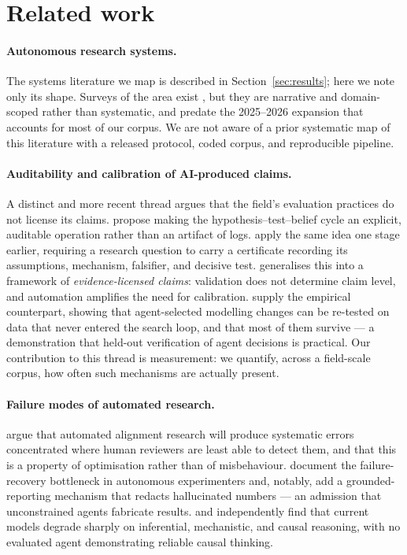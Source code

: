 \section{Related work}
\label{sec:related}

\paragraph{Autonomous research systems.} The systems literature we map is described in
Section~\ref{sec:results}; here we note only its shape. Surveys of the area exist
\citep{ramos2024llmchem}, but they are narrative and domain-scoped rather than systematic,
and predate the 2025--2026 expansion that accounts for most of our corpus. We are not aware
of a prior systematic map of this literature with a released protocol, coded corpus, and
reproducible pipeline.

\paragraph{Auditability and calibration of AI-produced claims.} A distinct and more recent
thread argues that the field's evaluation practices do not license its claims.
\citet{takahara2026hep} propose making the hypothesis--test--belief cycle an explicit,
auditable operation rather than an artifact of logs. \citet{wang2026firstresearch} apply the
same idea one stage earlier, requiring a research question to carry a certificate recording
its assumptions, mechanism, falsifier, and decisive test. \citet{li2026calibration} generalises
this into a framework of \emph{evidence-licensed claims}: validation does not determine claim
level, and automation amplifies the need for calibration. \citet{ning2026autoresearch}
supply the empirical counterpart, showing that agent-selected modelling changes can be
re-tested on data that never entered the search loop, and that most of them survive --- a
demonstration that held-out verification of agent decisions is practical. Our contribution to
this thread is measurement: we quantify, across a field-scale corpus, how often such
mechanisms are actually present.

\paragraph{Failure modes of automated research.} \citet{bowkis2026automated} argue that
automated alignment research will produce systematic errors concentrated where human
reviewers are least able to detect them, and that this is a property of optimisation rather
than of misbehaviour. \citet{ma2026sage} document the failure-recovery bottleneck in
autonomous experimenters and, notably, add a grounded-reporting mechanism that redacts
hallucinated numbers --- an admission that unconstrained agents fabricate results.
\citet{shi2026sdabench} and \citet{chen2026causalgame} independently find that current models
degrade sharply on inferential, mechanistic, and causal reasoning, with no evaluated agent
demonstrating reliable causal thinking.

